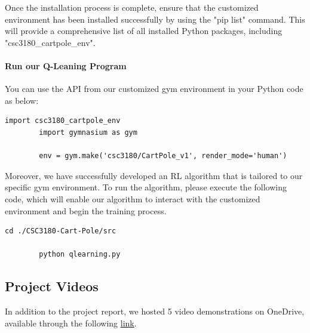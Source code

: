 \documentclass[10pt,a4paper]{article}
\begin{document}
	Once the installation process is complete, ensure that the customized environment has been installed successfully by using the "pip list" command. This will provide a comprehensive list of all installed Python packages, including  "csc3180\_cartpole\_env".
	
	
	\paragraph{Run our Q-Leaning Program}
	You can use the API from our customized gym environment in your Python code as below:
	\begin{lstlisting}[caption={use the customized environment in python}]
		import csc3180_cartpole_env
		import gymnasium as gym
		
		env = gym.make('csc3180/CartPole_v1', render_mode='human')
	\end{lstlisting}
	
	Moreover, we have successfully developed an RL algorithm that is tailored to our specific gym environment. To run the algorithm, please execute the following code, which will enable our algorithm to interact with the customized environment and begin the training process.
	
	\begin{lstlisting}[caption={To use setup.py to install our env packet}]
		cd ./CSC3180-Cart-Pole/src
		
		python qlearning.py
	\end{lstlisting}
	
	\subsection{Project Videos}
	In addition to the project report, we hosted 5 video demonstrations on OneDrive, available through the following \href{https://1drv.ms/f/s!AmutmbT5H6Pkm0sNJx83Q54XewmB?e=HUkzYK}{link}.
	
	
\end{document}
